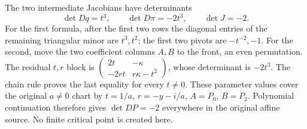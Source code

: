 \documentclass[11pt]{article}
\begin{document}
The two intermediate Jacobians have determinants
\[
 \det Dq=t^3,\qquad \det D\pi=-2t^3,\qquad \det J=-2.
 \tag{FD8}
\]
For the first formula, after the first two rows the diagonal
entries of the remaining triangular minor are \(t^3,t^2\);
the first two pivots are \(-t^{-2},-1\). For the second,
move the two coefficient columns \(A,B\) to the front, an
even permutation. The residual \(t,r\) block is
\(\left(\begin{smallmatrix}2t&-\kappa\\-2rt&r\kappa-t^2\end{smallmatrix}\right)\),
whose determinant is \(-2t^3\). The chain rule proves the
last equality for every \(t\ne0\). These parameter values
cover the original \(a\ne0\) chart by \(t=1/a\),
\(r=-y-i/a\), \(A=P_0\), \(B=P_2\). Polynomial continuation
therefore gives \(\det DP=-2\) everywhere in the original
affine source. No finite critical point is created here.
\end{document}
